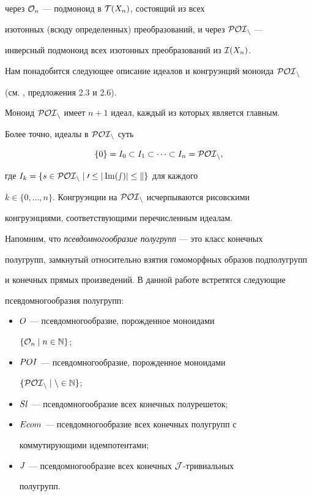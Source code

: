 через ${\cal O}_n$ --- подмоноид в ${\cal T}(X_n)$, состоящий из всех


изотонных (всюду определенных) преобразований, и через $\cal{POI}_n$ ---


инверсный подмоноид всех изотонных преобразований из ${\cal I}(X_n)$.





Нам понадобится следующее описание идеалов и конгруэнций моноида $\cal{POI}_n$


(см. \cite{VHF3}, предложения 2.3 и 2.6).





\begin{lems} \label{a3r2.6}


Моноид $\cal{POI}_n$ имеет $n+1$ идеал, каждый из которых является главным.


Более точно, идеалы в $\cal{POI}_n$ суть


$$


\{0\}=I_0\subset I_1\subset\dotsb\subset I_n=\poi_n,


$$


где $I_k=\{{s} \in \cal{POI}_n \mid 0\le |\operatorname{Im}({s})|\le k\}$ для каждого


$k\in\{0,\dotsc,n\}$. Конгруэнции на $\cal{POI}_n$ исчерпываются рисовскими


конгруэнциями, соответствующими перечисленным идеалам.


\end{lems}





Напомним, что {\it псевдомногообразие полугрупп\/} --- это класс конечных


полугрупп, замкнутый относительно взятия гомоморфных образов подполугрупп


и конечных прямых произведений. В данной работе встретятся следующие


псевдомногообразия полугрупп:


\begin{itemize}


\item[1.] $\boldmath{O}$ --- псевдомногообразие, порожденное моноидами


$\{{\cal O}_n\mid n\in\Bbb N\}$;


\item[2.] $\boldmath POI$ --- псевдомногообразие, порожденное моноидами


$\{\cal{POI}_n\mid n\in\Bbb N\}$;


\item[3.] $\boldmath{Sl}$ --- псевдомногообразие всех конечных полурешеток;


\item[4.] $\boldmath{Ecom}$ --- псевдомногообразие всех конечных полугрупп с


коммутирующими идемпотентами;


\item[5.] $\boldmath{J}$ --- псевдомногообразие всех конечных $\cal J$-тривиальных


полугрупп.


\end{itemize}





